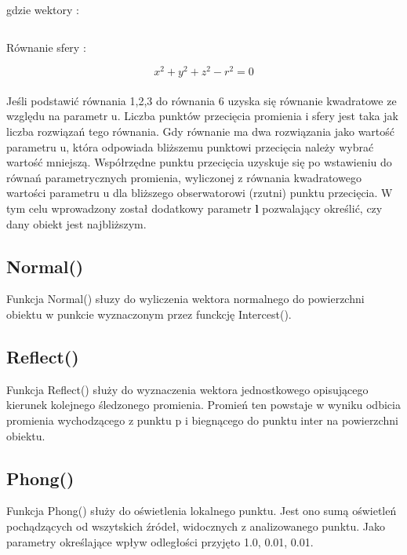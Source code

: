 \documentclass[wide,a4paper,titlepage,12pt] {article}
\begin{document}
gdzie wektory :

\begin{equation}
[ r_{0x} \ \ r_{0y} \ \ r_{0z} ]
\end{equation}
\begin{equation}
[ r_{dx} \ \ r_{dy} \ \ r_{dz} ]
\end{equation}

Równanie sfery : 

\begin{equation}
x^2 + y^2 + z^2 - r^2 = 0
\end{equation}
 
\paragraph{} %
\label{par:}
Jeśli podstawić równania 1,2,3 do równania 6  uzyska się równanie kwadratowe ze względu na parametr u. Liczba punktów przecięcia promienia i sfery jest taka jak liczba rozwiązań tego równania. Gdy równanie ma dwa rozwiązania jako wartość parametru u, która odpowiada bliższemu punktowi przecięcia należy wybrać wartość mniejszą. Współrzędne punktu przecięcia uzyskuje się po wstawieniu do równań parametrycznych promienia, wyliczonej z równania kwadratowego wartości parametru u dla bliższego obserwatorowi (rzutni) punktu przecięcia. W tym celu wprowadzony został dodatkowy parametr \textbf{l} pozwalający określić, czy dany obiekt jest najbliższym.



\subsection{Normal()}
Funkcja Normal() słuzy do wyliczenia wektora normalnego do powierzchni obiektu w punkcie wyznaczonym przez funckcję Intercest().

\subsection{Reflect()}
Funkcja Reflect() służy  do wyznaczenia wektora jednostkowego opisującego kierunek kolejnego śledzonego promienia. Promień ten powstaje w wyniku odbicia promienia wychodzącego z punktu p i biegnącego do punktu inter na powierzchni obiektu.


\subsection{Phong()}
Funkcja Phong() służy do oświetlenia lokalnego punktu. Jest ono sumą oświetleń pochądzących od wszytskich źródeł, widocznych z analizowanego punktu. Jako parametry określające wpływ odległości przyjęto 1.0, 0.01, 0.01.
\end{document}
